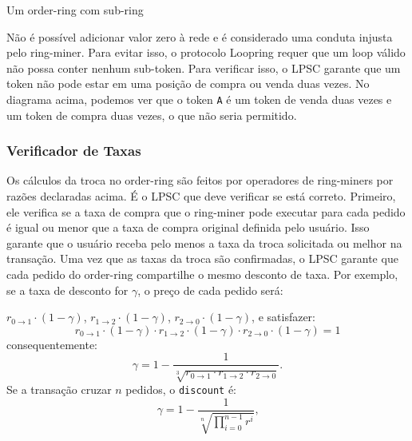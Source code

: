 \documentclass[UTF8,nofonts]{article}
\makeatletter
\newenvironment{figurehere}
 {\def\@captype{figure}}
 {}
\makeatother
\begin{document}
\begin{multicols}{2}
\begin{center}
\begin{figurehere}
\begin{tikzpicture}
\end{tikzpicture}

\caption{Um order-ring com sub-ring}
\label{fig:subring}
\end{figurehere}
\end{center}

Não é possível adicionar valor zero à rede e é considerado uma conduta injusta pelo ring-miner. Para evitar isso, o protocolo Loopring requer que um loop válido não possa conter nenhum sub-token. Para verificar isso, o LPSC garante que um token não pode estar em uma posição de compra ou venda duas vezes. No diagrama acima, podemos ver que o token \verb|A| é um token de venda duas vezes e um token de compra duas vezes, o que não seria permitido. 


\subsubsection{Verificador de Taxas\label{sec:fill_rate_check}}


Os cálculos da troca no order-ring são feitos por operadores de ring-miners por razões declaradas acima. É o LPSC que deve verificar se está correto. Primeiro, ele verifica se a taxa de compra que o ring-miner pode executar para cada pedido é igual ou menor que a taxa de compra original definida pelo usuário. Isso garante que o usuário receba pelo menos a taxa da troca solicitada ou melhor na transação. Uma vez que as taxas da troca são confirmadas, o LPSC garante que cada pedido do order-ring compartilhe o mesmo desconto de taxa. Por exemplo, se a taxa de desconto for $\gamma$, o preço de cada pedido será:

$r_{0\rightarrow 1} \cdot (1-\gamma)$, $r_{1\rightarrow 2} \cdot (1-\gamma)$, $r_{2 \rightarrow 0} \cdot (1-\gamma)$, e satisfazer: 
\begin{equation}
r_{0\rightarrow 1} \cdot (1-\gamma)\cdot r_{1\rightarrow 2} \cdot (1-\gamma) \cdot r_{2 \rightarrow 0} \cdot (1-\gamma) = 1
\end{equation}
consequentemente: 
\begin{equation}
\gamma = 1- \frac{1}{\sqrt[3]{r_{0\rightarrow 1} \cdot r_{1\rightarrow 2} \cdot r_{2\rightarrow 0}}}\text{.}
\end{equation}
Se a transação cruzar $n$ pedidos, o \texttt{discount} é: 
\begin{equation}
\gamma = 1- \frac{1}{\sqrt[n]{\prod_{i=0}^{n-1} r^i}} \text{,}
\end{equation}


\end{multicols}
\end{document}

